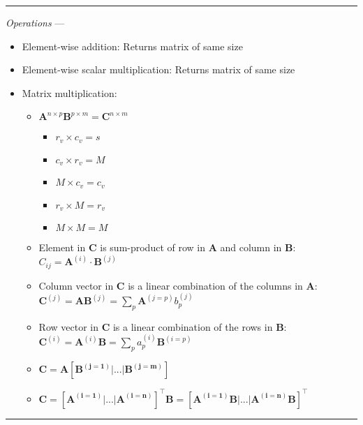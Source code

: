 {\color{lightgray}\hrule height 0.001mm}

\emph{Operations} ---
\begin{itemize}
    \item Element-wise addition: Returns matrix of same size
    \item Element-wise scalar multiplication: Returns matrix of same size
    \item Matrix multiplication: 
    \begin{itemize}
        \item $\boldsymbol{A}^{n \times p}\boldsymbol{B}^{p \times m}=\boldsymbol{C}^{n \times m}$
        \begin{multicols}{2}
        \begin{itemize}
            \item $r_v \times c_v = s$
            \item $c_v \times r_v = M$
            \item $M \times c_v = c_v$
            \item $r_v \times M = r_v$ 
            \item $M \times M = M$
        \end{itemize}
        \end{multicols}
        \item Element in $\boldsymbol{C}$ is sum-product of row in $\boldsymbol{A}$ and column in $\boldsymbol{B}$: $C_{ij} = \boldsymbol{A}^{(i)} \cdot \boldsymbol{B}^{(j)}$
        \item Column vector in $\boldsymbol{C}$ is a linear combination of the columns in $\boldsymbol{A}$: $\boldsymbol{C}^{(j)} = \boldsymbol{A} \boldsymbol{B}^{(j)} = \sum_p \boldsymbol{A}^{(j=p)} b_{p}^{(j)}$
        \item Row vector in $\boldsymbol{C}$ is a linear combination of the rows in $\boldsymbol{B}$: $\boldsymbol{C}^{(i)} = \boldsymbol{A}^{(i)} \boldsymbol{B} = \sum_p a_{p}^{(i)} \boldsymbol{B}^{(i=p)}$
        \item $\boldsymbol{C} = \boldsymbol{A}[\boldsymbol{B^{(j=1)}} | ... | \boldsymbol{B^{(j=m)}}]$
        \item $\boldsymbol{C} = [\boldsymbol{A^{(i=1)}} | ... | \boldsymbol{A^{(i=n)}}]^\intercal \boldsymbol{B} = [\boldsymbol{A^{(i=1)}} \boldsymbol{B} | ... | \boldsymbol{A^{(i=n)}} \boldsymbol{B}]^\intercal$
    \end{itemize}
\end{itemize}

{\color{lightgray}\hrule height 0.001mm}

